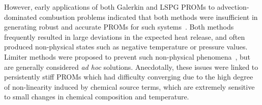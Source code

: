 However, early applications of both Galerkin and LSPG PROMs to advection-dominated combustion problems indicated that both methods were insufficient in generating robust and accurate PROMs for such systems~\cite{Huang2018b,Huang2019}. Both methods frequently resulted in large deviations in the expected heat release, and often produced non-physical states such as negative temperature or pressure values. Limiter methods were proposed to prevent such non-physical phenomena~\cite{Huang2019,Huang2020}, but are generally considered \textit{ad hoc} solutions. Anecdotally, these issues were linked to persistently stiff PROMs which had difficulty converging due to the high degree of non-linearity induced by chemical source terms, which are extremely sensitive to small changes in chemical composition and temperature.